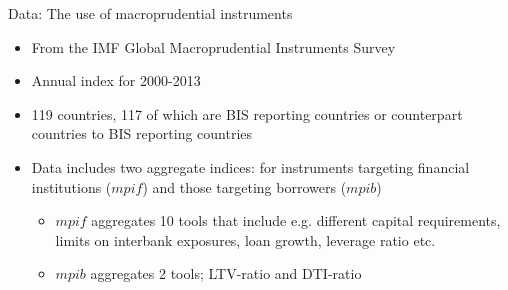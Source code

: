 \documentclass{beamer}
\begin{document}

\begin{frame}{Data: The use of macroprudential instruments}
\begin{itemize}
\item From the IMF Global Macroprudential Instruments Survey
\item Annual index for 2000-2013
\item 119 countries, 117 of which are BIS reporting countries or counterpart countries to BIS reporting countries 
\item Data includes two aggregate indices: for instruments targeting financial institutions ($mpif$) and those targeting borrowers ($mpib$)
\begin{itemize}
\item $mpif$ aggregates 10 tools that include e.g. different capital requirements, limits on interbank exposures, loan growth, leverage ratio etc.
\item $mpib$ aggregates 2 tools; LTV-ratio and DTI-ratio
\end{itemize}
\end{itemize}
\end{frame}

\end{document}
